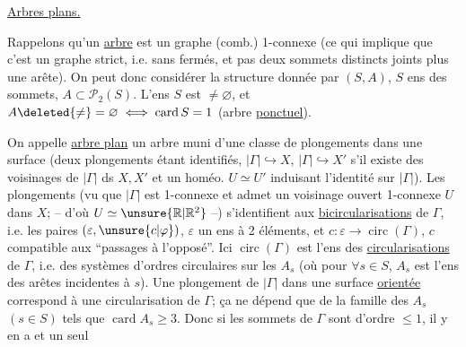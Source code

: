\uline{Arbres plans.}\hfill{}

Rappelons qu'un \uline{arbre} est un graphe (comb.) 1-connexe (ce qui implique que c'est un graphe strict, i.e. sans  fermés, et pas deux  sommets distincts joints  plus une arête). On peut donc considérer la structure donnée par $(S,A)$, $S$ ens des sommets, $A\subset\mathcal P_2(S)$.  L'ens $S$ est $\ne\varnothing$, et $A\deleted{\ne}=\varnothing\iff\operatorname{card}S=1$ (arbre \uline{ponctuel}).

On appelle \uline{arbre plan} un arbre muni d'une classe de plongements dans une surface (deux plongements étant identifiés, $|\Gamma|\hookrightarrow X$, $|\Gamma|\hookrightarrow X'$ s'il existe des voisinages de $|\Gamma|$ ds $X,X'$ et un homéo. $U\simeq U'$ induisant l'identité sur $|\Gamma|$). Les  plongements (vu que $|\Gamma|$ est 1-connexe et admet un voisinage ouvert 1-connexe $U$ dans $X$; -- d'où $U\simeq\unsure{\mathbb R|\mathbb R^2}$ --) s'identifient aux \uline{bicircularisations} de $\Gamma$, i.e. les  paires $(\varepsilon,\unsure{c|\varphi})$, $\varepsilon$ un ens à 2 éléments,  et $c:\varepsilon\longrightarrow\operatorname{circ}(\Gamma)$, $c$ compatible aux ``passages à l'opposé''. Ici $\operatorname{circ}(\Gamma)$ est l'ens des \uline{circularisations} de $\Gamma$, i.e. des systèmes d'ordres circulaires sur les $A_s$ (où pour $\forall s\in S$, $A_s$ est l'ens des arêtes incidentes à $s$). Une  plongement de $|\Gamma|$ dans une surface \uline{orientée} correspond à une circularisation de $\Gamma$; ça ne dépend que de la famille des $A_s$ $(s\in S)$ tels que $\operatorname{card}A_s\geq3$. Donc si les sommets de $\Gamma$ sont d'ordre $\leq1$, il y en a  et un seul
